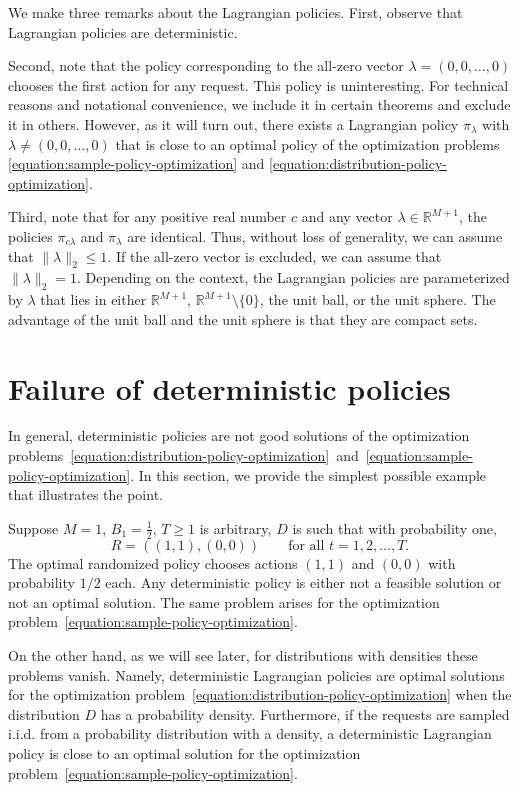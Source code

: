 \documentclass[12pt]{article}
\newcommand{\R}{\mathbb{R}}
\theoremstyle{definition}
\begin{document}
We make three remarks about the Lagrangian policies. First, observe that
Lagrangian policies are deterministic.

Second, note that the policy corresponding to the all-zero vector $\lambda = (0,
0, \dots, 0)$ chooses the first action for any request. This policy is
uninteresting. For technical reasons and notational convenience, we include it
in certain theorems and exclude it in others. However, as it will turn out,
there exists a Lagrangian policy $\pi_\lambda$ with $\lambda \neq (0, 0, \dots,
0)$ that is close to an optimal policy of the optimization problems
\eqref{equation:sample-policy-optimization} and
\eqref{equation:distribution-policy-optimization}.

Third, note that for any positive real number $c$ and any vector $\lambda \in
\R^{M+1}$, the policies $\pi_{c \lambda}$ and $\pi_\lambda$ are identical. Thus,
without loss of generality, we can assume that $\|\lambda\|_2 \le 1$. If the
all-zero vector is excluded, we can assume that $\|\lambda\|_2 = 1$. Depending
on the context, the Lagrangian policies are parameterized by $\lambda$ that lies
in either $\R^{M+1}$, $\R^{M+1} \setminus \{0\}$, the unit ball, or the unit
sphere. The advantage of the unit ball and the unit sphere is that they are
compact sets.

\section{Failure of deterministic policies}

In general, deterministic policies are not good solutions of the optimization
problems~\eqref{equation:distribution-policy-optimization}~and~\eqref{equation:sample-policy-optimization}.
In this section, we provide the simplest possible example that illustrates the
point.

Suppose $M=1$, $B_1 = \frac{1}{2}$, $T \ge 1$ is arbitrary, $D$ is such that with probability one,
$$
R = ((1, 1), (0, 0)) \qquad \text{for all $t=1,2,\dots,T$.}
$$
The optimal randomized policy chooses actions $(1, 1)$ and $(0, 0)$ with
probability $1/2$ each. Any deterministic policy is either not a feasible
solution or not an optimal solution. The same problem arises for the
optimization problem~\eqref{equation:sample-policy-optimization}.

On the other hand, as we will see later, for distributions with densities these
problems vanish. Namely, deterministic Lagrangian policies are optimal solutions
for the optimization problem~\eqref{equation:distribution-policy-optimization}
when the distribution $D$ has a probability density. Furthermore, if the
requests are sampled i.i.d. from a probability distribution with a density, a
deterministic Lagrangian policy is close to an optimal solution for the
optimization problem~\eqref{equation:sample-policy-optimization}.
\end{document}
